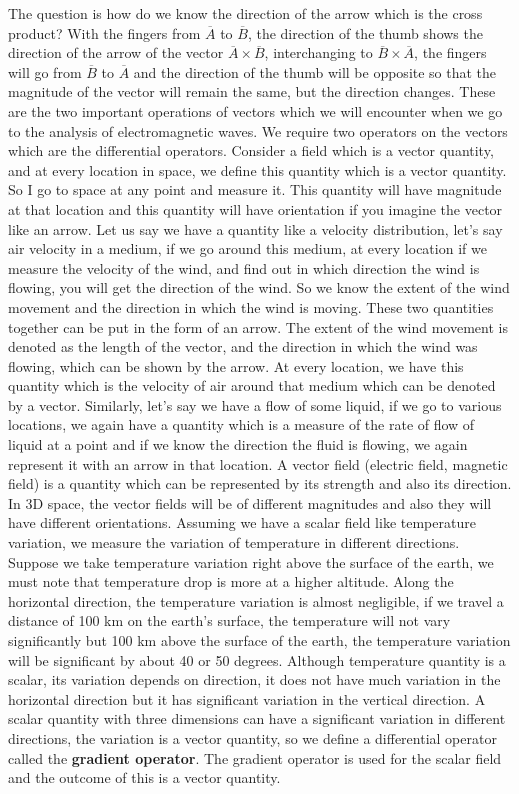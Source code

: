 The question is how do we know the direction of the arrow which is the cross product? With the fingers from $\overline{A}$ to $\overline{B}$, the direction of the thumb shows the direction of the arrow of the vector $\overline{A} \times \overline{B}$, interchanging to $\overline{B} \times \overline{A}$, the fingers will go from $\overline{B}$ to $\overline{A}$ and the direction of the thumb will be opposite so that the magnitude of the vector will remain the same, but the direction changes. These are the two important operations of vectors which we will encounter when we go to the analysis of electromagnetic waves. We require two operators on the vectors which are the differential operators. Consider a field which is a vector quantity, and at every location in space, we define this quantity which is a vector quantity. So I go to space at any point and measure it. This quantity will have magnitude at that location and this quantity will have orientation if you imagine the vector like an arrow. Let us say we have a quantity like a velocity distribution, let's say air velocity in a medium, if we go around this medium, at every location if we measure the velocity of the wind, and find out in which direction the wind is flowing, you will get the direction of the wind. So we know the extent of the wind movement and the direction in which the wind is moving. These two quantities together can be put in the form of an arrow. The extent of the wind movement is denoted as the length of the vector, and the direction in which the wind was flowing, which can be shown by the arrow. At every location, we have this quantity which is the velocity of air around that medium which can be denoted by a vector. Similarly, let's say we have a flow of some liquid, if we go to various locations, we again have a quantity which is a measure of the rate of flow of liquid at a point and if we know the direction the fluid is flowing, we again represent it with an arrow in that location. A vector field (electric field, magnetic field) is a quantity which can be represented by its strength and also its direction. In 3D space, the vector fields will be of different magnitudes and also they will have different orientations. Assuming we have a scalar field like temperature variation, we measure the variation of temperature in different directions. Suppose we take temperature variation right above the surface of the earth, we must note that temperature drop is more at a higher altitude. Along the horizontal direction, the temperature variation is almost negligible, if we travel a distance of 100 km on the earth's surface, the temperature will not vary significantly but 100 km above the surface of the earth, the temperature variation will be significant by about 40 or 50 degrees. Although temperature quantity is a scalar, its variation depends on direction, it does not have much variation in the horizontal direction but it has significant variation in the vertical direction. A scalar quantity with three dimensions can have a significant variation in different directions, the variation is a vector quantity, so we define a differential operator called the \textbf{gradient operator}. The gradient operator is used for the scalar field and the outcome of this is a vector quantity.


